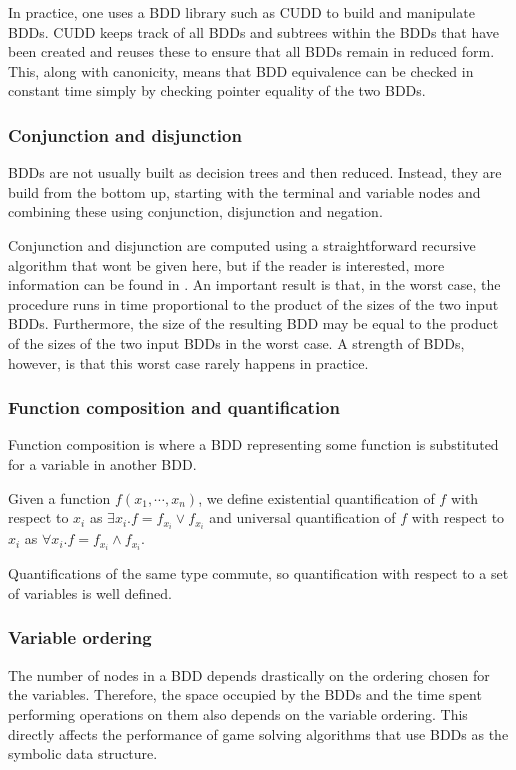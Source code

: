 \documentclass[a4paper,twoside,openright,11pt]{book}
\theoremstyle{definition}
\begin{document}
In practice, one uses a BDD library such as CUDD \cite{cudd} to build and manipulate BDDs. CUDD keeps track of all BDDs and subtrees within the BDDs that have been created and reuses these to ensure that all BDDs remain in reduced form. This, along with canonicity, means that BDD equivalence can be checked in constant time simply by checking pointer equality of the two BDDs.

\subsubsection{Conjunction and disjunction}

BDDs are not usually built as decision trees and then reduced. Instead, they are build from the bottom up, starting with the terminal and variable nodes and combining these using conjunction, disjunction and negation.

Conjunction and disjunction are computed using a straightforward recursive algorithm that wont be given here, but if the reader is interested, more information can be found in \cite{somenzi_bdd}. An important result is that, in the worst case, the procedure runs in time proportional to the product of the sizes of the two input BDDs. Furthermore, the size of the resulting BDD may be equal to the product of the sizes of the two input BDDs in the worst case. A strength of BDDs, however, is that this worst case rarely happens in practice. 

\subsubsection{Function composition and quantification}

Function composition is where a BDD representing some function is substituted for a variable in another BDD.

Given a function $f(x_1,\cdots,x_n)$, we define existential quantification of $f$ with respect to $x_i$ as $\exists x_i. f = f_{x_i} \vee f_{x_i}$ and universal quantification of $f$ with respect to $x_i$ as $\forall x_i. f = f_{x_i} \wedge f_{x_i}$.

Quantifications of the same type commute, so quantification with respect to a set of variables is well defined. 

\subsubsection{Variable ordering}

The number of nodes in a BDD depends drastically on the ordering chosen for the variables. Therefore, the space occupied by the BDDs and the time spent performing operations on them also depends on the variable ordering. This directly affects the performance of game solving algorithms that use BDDs as the symbolic data structure. 
\end{document}
